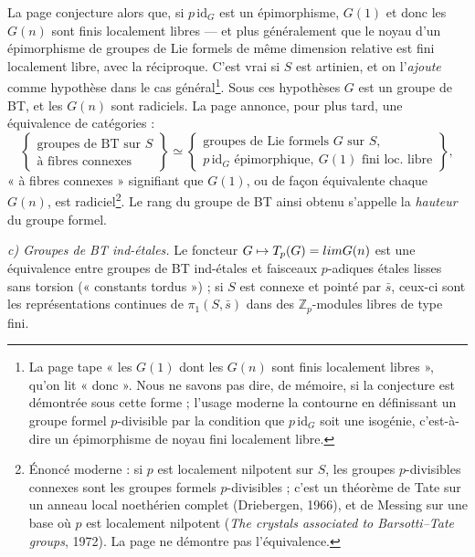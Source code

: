 \documentclass[11pt,a4paper]{article}
\begin{document}
La page conjecture alors que, si $p\,\mathrm{id}_G$ est un épimorphisme,
$G(1)$ et donc les $G(n)$ sont finis localement libres — et plus
généralement que le noyau d'un épimorphisme de groupes de Lie formels de
même dimension relative est fini localement libre, avec la réciproque.
C'est vrai si $S$ est artinien, et on l'\emph{ajoute} comme hypothèse
dans le cas général\footnote{La page tape « les $G(1)$ dont les $G(n)$
sont finis localement libres », qu'on lit « donc ». Nous ne savons pas
dire, de mémoire, si la conjecture est démontrée sous cette forme ;
l'usage moderne la contourne en définissant un groupe formel
$p$-divisible par la condition que $p\,\mathrm{id}_G$ soit une isogénie,
c'est-à-dire un épimorphisme de noyau fini localement libre.}. Sous ces
hypothèses $G$ est un groupe de BT, et les $G(n)$ sont radiciels. La page
annonce, pour plus tard, une équivalence de catégories :
\[
\left\{ \begin{array}{c} \text{groupes de BT sur } S \\ \text{à fibres connexes} \end{array} \right\}
\simeq
\left\{ \begin{array}{c} \text{groupes de Lie formels } G \text{ sur } S, \\
p\,\mathrm{id}_G \text{ épimorphique}, \ G(1) \text{ fini loc.\ libre} \end{array} \right\},
\]
« à fibres connexes » signifiant que $G(1)$, ou de façon équivalente
chaque $G(n)$, est radiciel\footnote{Énoncé moderne : si $p$ est
localement nilpotent sur $S$, les groupes $p$-divisibles connexes sont
les groupes formels $p$-divisibles ; c'est un théorème de Tate sur un
anneau local noethérien complet (Driebergen, 1966), et de Messing sur une
base où $p$ est localement nilpotent (\emph{The crystals associated to
Barsotti–Tate groups}, 1972). La page ne démontre pas l'équivalence.}.
Le rang du groupe de BT ainsi obtenu s'appelle la \emph{hauteur} du
groupe formel.

\emph{c) Groupes de BT ind-étales.} Le foncteur $G \mapsto T_p(G) =
\varprojlim G(n)$ est une équivalence entre groupes de BT ind-étales et
faisceaux $p$-adiques étales lisses sans torsion (« constants tordus ») ;
si $S$ est connexe et pointé par $\bar s$, ceux-ci sont les représentations
continues de $\pi_1(S, \bar s)$ dans des $\mathbb{Z}_p$-modules libres de
type fini.
\end{document}
